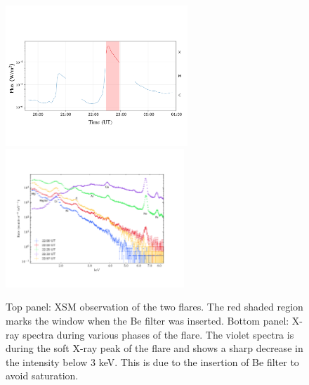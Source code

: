 \documentclass[lineno, pdflatex,sn-mathphys-ay]{sn-jnl}%
\begin{document}
\begin{figure}
    \centering
    \includegraphics[trim={0.5cm 3.3cm 0.8cm 4cm}, clip, width=0.61\textwidth]{xsm_lc.pdf} \\
    \includegraphics[trim={1.8cm 2.5cm 3cm 3cm},clip,width=0.6\textwidth]{xsm_spec.pdf}
    \caption{Top panel: XSM observation of the two flares. The red shaded region marks the window when the Be filter was inserted. Bottom panel: X-ray spectra during various phases of the flare. The violet spectra is during the soft X-ray peak of the flare and shows a sharp decrease in the intensity below 3 keV. This is due to the insertion of Be filter to avoid saturation.}
    \label{fig:xsm-obs}
\end{figure}
\end{document}
